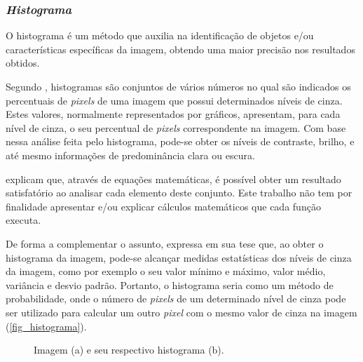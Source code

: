 \subsubsection{\textit{Histograma}}

O histograma é um método que auxilia na identificação de objetos e/ou características específicas da imagem, obtendo uma maior precisão nos resultados obtidos.

Segundo , histogramas são conjuntos de vários números no qual são indicados os percentuais de \textit{pixels} de uma imagem que possui determinados níveis de cinza. Estes valores, normalmente representados por gráficos, apresentam, para cada nível de cinza, o seu percentual de \textit{pixels} correspondente na imagem. Com base nessa análise feita pelo histograma, pode-se obter os níveis de contraste, brilho, e até mesmo informações de predominância clara ou escura.

 explicam que, através de equações matemáticas, é possível obter um resultado satisfatório ao analisar cada elemento deste conjunto. Este trabalho não tem por finalidade apresentar e/ou explicar cálculos matemáticos que cada função executa.

De forma a complementar o assunto,  expressa em sua tese que, ao obter o histograma da imagem, pode-se alcançar medidas estatísticas dos níveis de cinza da imagem, como por exemplo o seu valor mínimo e máximo, valor médio, variância e desvio padrão. Portanto, o histograma seria como um método de probabilidade, onde o número de \textit{pixels} de um determinado nível de cinza pode ser utilizado para calcular um outro \textit{pixel} com o mesmo valor de cinza na imagem (\autoref{fig_histograma}).

\begin{figure}[h]
	\caption{\label{fig_histograma}Imagem (a) e seu respectivo histograma (b).}
	\begin{center}
	\end{center}
	\centering {}
\end{figure}
